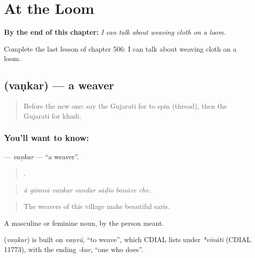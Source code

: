 
\chapter{At the Loom}
\label{ch:gu-at-the-loom}

\begin{chapteropening}
\textbf{By the end of this chapter:} \emph{I can talk about weaving cloth on a loom.}

Complete the last lesson of chapter 506: I can talk about weaving cloth on a loom.
\end{chapteropening}

\section[\texorpdfstring{\gu{વણકર} (vaṇkar)}{વણકર (vaṇkar)}]{ (vaṇkar) — a weaver}

\label{lesson:GU-C506-vankar}



\begin{quote}
Before the new one: say the Gujarati for to spin (thread), then the Gujarati for khadi.
\end{quote}

\subsection*{You'll want to know: }
\textbf{} — \emph{vaṇkar} — \textquotedblleft{}a weaver\textquotedblright{}.

\begin{quote}
      .
\end{quote}

\begin{quote}
\emph{ā gāmnā vaṇkar sundar sāḍīo banāve che.}
\end{quote}

\begin{quote}
The weavers of this village make beautiful saris.
\end{quote}

A masculine or feminine noun, by the person meant.

\begin{cousinweb}
\textbf{} (\emph{vaṇkar}) is built on \emph{vaṇvũ}, \textquotedblleft{}to weave\textquotedblright{}, which CDIAL lists under \emph{*vināti} (CDIAL 11773), with the ending \emph{-kar}, \textquotedblleft{}one who does\textquotedblright{}.
\end{cousinweb}

